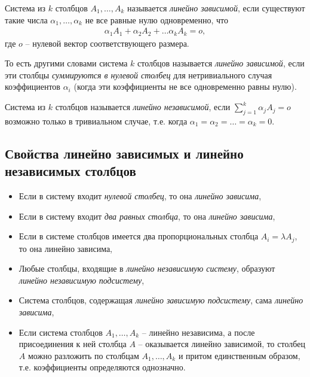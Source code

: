 \documentclass[%
	11pt,
	a4paper,
	utf8,
		]{article}
\begin{document}
Система из $ k $ столбцов $ A_1, \ldots, A_k $ называется \emph{линейно зависимой}, если существуют такие числа $ \alpha_1, \ldots, \alpha_k $ не все равные нулю одновременно, что \cite[]{bortakovskiy:2005}
\begin{align*}
	\alpha_1 A_1 + \alpha_2 A_2 + \ldots \alpha_k A_k = o,
\end{align*}
где $ o $ -- нулевой вектор соответствующего размера.

То есть другими словами система $ k $ столбцов называется \emph{линейно зависимой}, если эти столбцы \emph{суммируются в нулевой столбец} для нетривиального случая коэффициентов $ \alpha_i $ (когда эти коэффициенты не все одновременно равны нулю).

Система из $ k $ столбцов называется \emph{линейно независимой}, если $ \sum\limits_{j=1}^k \alpha_j A_j = o $ возможно только в тривиальном случае, т.е. когда $ \alpha_1 = \alpha_2 = \ldots = \alpha_k = 0 $.

\subsection{Свойства линейно зависимых и линейно независимых столбцов}


\begin{itemize}
	\item Если в систему входит \emph{нулевой столбец}, то она \emph{линейно зависима},
	
	\item Если в систему входит \emph{два равных столбца}, то она \emph{линейно зависима},
	
	\item Если в системе столбцов имеется два пропорциональных столбца $ A_i = \lambda A_j $, то она линейно зависима,
	
	\item Любые столбцы, входящие в \emph{линейно независимую систему}, образуют \emph{линейно независимую подсистему},
	
	\item Система столбцов, содержащая \emph{линейно зависимую подсистему}, сама \emph{линейно зависима},
	
	\item Если система столбцов $ A_1, \ldots,A_k $ -- линейно независима, а после присоединения к ней столбца $ A $ -- оказывается линейно зависимой, то столбец $ A $ можно разложить по столбцам $ A_1, \ldots, A_k $ и притом единственным образом, т.е. коэффициенты определяются однозначно.
\end{itemize}
\end{document}
